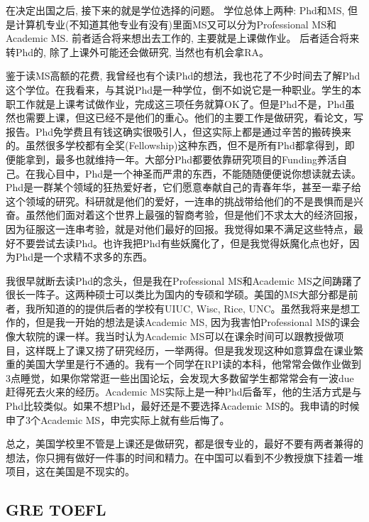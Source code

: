 在决定出国之后, 接下来的就是学位选择的问题。 学位总体上两种: Phd和MS, 但是计算机专业(不知道其他专业有没有)里面MS又可以分为Professional MS和Academic MS. 前者适合将来想出去工作的, 主要就是上课做作业。 后者适合将来转Phd的, 除了上课外可能还会做研究, 当然也有机会拿RA。\par

鉴于读MS高额的花费, 我曾经也有个读Phd的想法，我也花了不少时间去了解Phd这个学位。在我看来，与其说Phd是一种学位，倒不如说它是一种职业。学生的本职工作就是上课考试做作业，完成这三项任务就算OK了。但是Phd不是，Phd虽然也需要上课，但这已经不是他们的重心。他们的主要工作是做研究，看论文，写报告。Phd免学费且有钱这确实很吸引人，但这实际上都是通过辛苦的搬砖换来的。虽然很多学校都有全奖(Fellowship)这种东西，但不是所有Phd都拿得到，即便能拿到，最多也就维持一年。大部分Phd都要依靠研究项目的Funding养活自己。在我心目中，Phd是一个神圣而严肃的东西，不能随随便便说你想读就去读。Phd是一群某个领域的狂热爱好者，它们愿意奉献自己的青春年华，甚至一辈子给这个领域的研究。科研就是他们的爱好，一连串的挑战带给他们的不是畏惧而是兴奋。虽然他们面对着这个世界上最强的智商考验，但是他们不求太大的经济回报，因为征服这一连串考验，就是对他们最好的回报。我觉得如果不满足这些特点，最好不要尝试去读Phd。也许我把Phd有些妖魔化了，但是我觉得妖魔化点也好，因为Phd是一个求精不求多的东西。\par

我很早就断去读Phd的念头，但是我在Professional MS和Academic MS之间踌躇了很长一阵子。这两种硕士可以类比为国内的专硕和学硕。美国的MS大部分都是前者，我所知道的的提供后者的学校有UIUC, Wisc, Rice, UNC。虽然我将来是想工作的，但是我一开始的想法是读Academic MS,  因为我害怕Professional MS的课会像大软院的课一样。我当时认为Academic MS可以在课余时间可以跟教授做项目，这样既上了课又捞了研究经历，一举两得。但是我发现这种如意算盘在课业繁重的美国大学里是行不通的。我有一个同学在RPI读的本科，他常常会做作业做到3点睡觉，如果你常常逛一些出国论坛，会发现大多数留学生都常常会有一波due赶得死去火来的经历。Academic MS实际上是一种Phd后备军，他的生活方式是与Phd比较类似。如果不想Phd，最好还是不要选择Academic MS的。我申请的时候申了3个Academic MS，申完实际上就有些后悔了。\par

总之，美国学校里不管是上课还是做研究，都是很专业的，最好不要有两者兼得的想法，你只拥有做好一件事的时间和精力。在中国可以看到不少教授旗下挂着一堆项目，这在美国是不现实的。

\subsection{GRE TOEFL}

